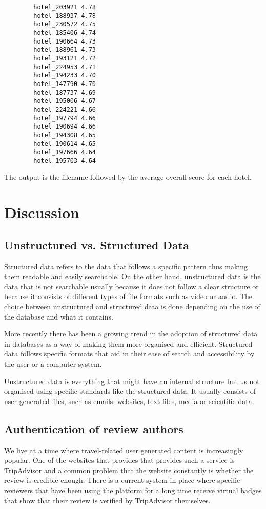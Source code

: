 \documentclass[titlepage]{article}
\begin{document}
        \begin{lstlisting}
        hotel_203921 4.78
        hotel_188937 4.78
        hotel_230572 4.75
        hotel_185406 4.74
        hotel_190664 4.73
        hotel_188961 4.73
        hotel_193121 4.72
        hotel_224953 4.71
        hotel_194233 4.70
        hotel_147790 4.70
        hotel_187737 4.69
        hotel_195006 4.67
        hotel_224221 4.66
        hotel_197794 4.66
        hotel_190694 4.66
        hotel_194308 4.65
        hotel_190614 4.65
        hotel_197666 4.64
        hotel_195703 4.64
        \end{lstlisting}
        
        The output is the filename followed by the average overall score for each hotel.
        
        \section{Discussion}
            \subsection{Unstructured vs. Structured Data}
            Structured data refers to the data that follows a specific pattern thus making them readable and easily searchable. On the other hand, unstructured data is the data that is not searchable usually because it does not follow a clear structure or because it consists of different types of file formats such as video or audio. The choice between unstructured and structured data is done depending on the use of the database and what it contains.
            
            More recently there has been a growing trend in the adoption of structured data in databases as a way of making them more organised and efficient. Structured data follows specific formats that aid in their ease of search and accessibility by the user or a computer system.
            
            Unstructured data is everything that might have an internal structure but us not organised using specific standards like the structured data. It usually consists of user-generated files, such as emails, websites, text files, media or scientific data.
            
            
            \subsection{Authentication of review authors}
            We live at a time where travel-related user generated content is increasingly popular. One of the websites that provides that provides such a service is TripAdvisor and a common problem that the website constantly is whether the review is credible enough. There is a current system in place where specific reviewers that have been using the platform for a long time receive virtual badges that show that their review is verified by TripAdvisor themselves.
            
\end{document}
